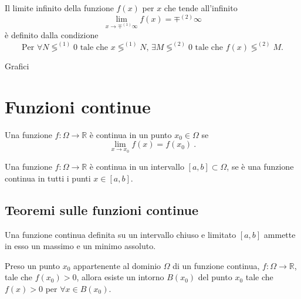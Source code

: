 \begin{definition} Il limite infinito della funzione $f(x)$ per $x$ che tende all'infinito
    \begin{equation}
        \lim_{x \rightarrow \mp^{(1)} \infty} f(x) = \mp^{(2)} \infty
    \end{equation}
    è definito dalla condizione
    \begin{equation}
        \text{Per $\forall N \lessgtr^{(1)} 0$ tale che $x \lessgtr^{(1)} N$, $\exists M \lessgtr^{(2)} 0$ tale che $f(x) \lessgtr^{(2)} M$.}
    \end{equation}
\end{definition}

{\color{red}Grafici}

\section{Funzioni continue}
\begin{definition} Una funzione $f: \Omega \rightarrow \mathbb{R}$ è continua in un punto $x_0 \in \Omega$ se 
    \begin{equation}
        \lim_{x \rightarrow x_0}f(x) = f(x_0) \ .
    \end{equation}
\end{definition}
\begin{definition} Una funzione $f: \Omega \rightarrow \mathbb{R}$ è continua in un intervallo $[a, b] \subset \Omega$, se è una funzione continua in tutti i punti $x \in [a, b]$.
\end{definition}

\subsection{Teoremi sulle funzioni continue}
\begin{theorem}\label{thm:weierstrass} Una funzione continua definita su un intervallo chiuso e limitato $[a, b]$ ammette in esso un massimo e un minimo assoluto.
\end{theorem}

\begin{theorem}\label{thm:sign} Preso un punto $x_0$ appartenente al dominio $\Omega$ di un funzione continua, $f: \Omega \rightarrow \mathbb{R}$, tale che $f(x_0)>0$, allora esiste un intorno $B(x_0)$ del punto $x_0$ tale che $f(x) > 0$ per $\forall x \in B(x_0)$.
\end{theorem}

